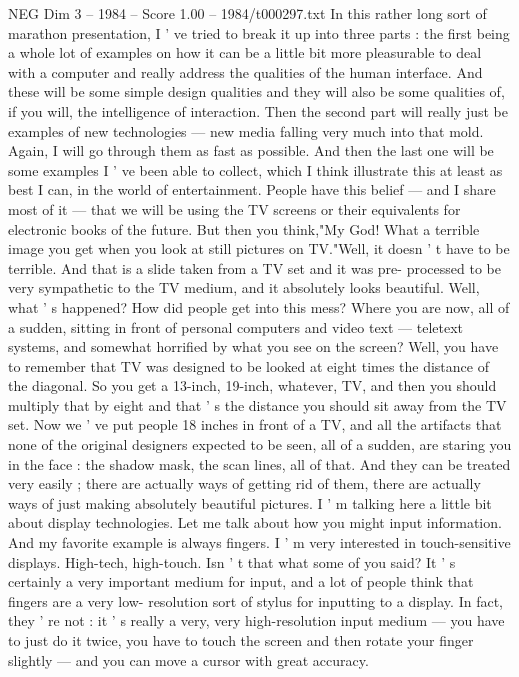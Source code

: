 \begin{textsample}{NEG Dim 3 – 1984 – Score 1.00 – 1984/t000297.txt}  \label{ex:f3_neg_005}
In this rather long sort of marathon presentation, I ' ve tried to break it up into three parts : the first being a whole lot of examples on how it can be a little bit more pleasurable to deal with a computer and really address the qualities of the human interface.
And these will be some simple design qualities and they will also be some qualities of, if you will, the intelligence of interaction.
Then the second part will really just be examples of new technologies — new media falling very much into that mold.
Again, I will go through them as fast as possible.
And then the last one will be some examples I ' ve been able to collect, which I think illustrate this at least as best I can, in the world of entertainment.
People have this belief — and I share most of it — that we will be using the TV screens or their equivalents for electronic books of the future.
But then you think,"My God!
What a terrible image you get when you look at still pictures on TV."Well, it doesn ' t have to be terrible.
And that is a slide taken from a TV set and it was pre- processed to be very sympathetic to the TV medium, and it absolutely looks beautiful.
Well, what ' s happened?
How did people get into this mess?
Where you are now, all of a sudden, sitting in front of personal computers and video text — teletext systems, and somewhat horrified by what you see on the screen?
Well, you have to remember that TV was designed to be looked at eight times the distance of the diagonal.
So you get a 13-inch, 19-inch, whatever, TV, and then you should multiply that by eight and that ' s the distance you should sit away from the TV set.
Now we ' ve put people 18 inches in front of a TV, and all the artifacts that none of the original designers expected to be seen, all of a sudden, are staring you in the face : the shadow mask, the scan lines, all of that.
And they can be treated very easily ; there are actually ways of getting rid of them, there are actually ways of just making absolutely beautiful pictures.
I ' m talking here a little bit about display technologies.
Let me talk about how you might input information.
And my favorite example is always fingers.
I ' m very interested in touch-sensitive displays.
High-tech, high-touch.
Isn ' t that what some of you said?
It ' s certainly a very important medium for input, and a lot of people think that fingers are a very low- resolution sort of stylus for inputting to a display.
In fact, they ' re not : it ' s really a very, very high-resolution input medium — you have to just do it twice, you have to touch the screen and then rotate your finger slightly — and you can move a cursor with great accuracy.

\end{textsample}
